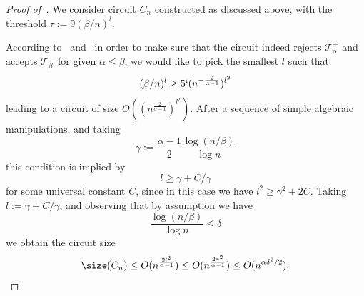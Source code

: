 \begin{proof}[Proof of~]

We consider circuit $C_n$ constructed as discussed above, with the threshold $\tau := 9 (\beta/n)^l$.  

According to~ and~ in order to make sure that the circuit indeed rejects $\mathcal{T}^-_{\alpha}$ and accepts $\mathcal{T}^+_{\beta}$ for given $\alpha \leq \beta$, we would like to pick the smallest $l$ such that
\begin{equation*}
    (\beta/n)^l \geq 5` (n^{-\frac{2}{\alpha-1}})^{l^2}
\end{equation*}
leading to a circuit of size $O((n^{\frac{2}{\alpha - 1}})^{l^2})$. After a sequence of simple algebraic manipulations, and taking
$$
\gamma := \frac{\alpha - 1}{2} \frac{\log(n/\beta)}{\log n}
$$
this condition is implied by
$$
l \geq \gamma + C/\gamma 
$$
for some universal constant $C$, since in this case we have $l^2 \geq \gamma^2 + 2C$. Taking $l := \gamma + C/\gamma$, and observing that by assumption we have
\begin{equation*}
    \frac{\log(n/\beta)}{\log n} \leq \delta
\end{equation*} 
we obtain the circuit size
\begin{equation*}
    \size(C_n) \leq O(n^{\frac{2l^2 }{\alpha - 1}}) \leq  O(n^{\frac{2\gamma^2}{\alpha-1}}) \leq O(n^{\alpha \delta^2/2}).
\end{equation*}
\end{proof}